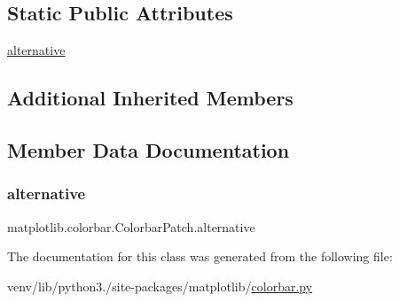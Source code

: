 \subsection*{Static Public Attributes}
\begin{DoxyCompactItemize}
\item 
\hyperlink{classmatplotlib_1_1colorbar_1_1ColorbarPatch_a7f76bba552f8eb48254b27a4f84a7993}{alternative}
\end{DoxyCompactItemize}
\subsection*{Additional Inherited Members}


\subsection{Member Data Documentation}
\mbox{\label{classmatplotlib_1_1colorbar_1_1ColorbarPatch_a7f76bba552f8eb48254b27a4f84a7993}} 
\subsubsection{\texorpdfstring{alternative}{alternative}}
{\footnotesize\ttfamily matplotlib.\+colorbar.\+Colorbar\+Patch.\+alternative\hspace{0.3cm}{\ttfamily [static]}}



The documentation for this class was generated from the following file\+:\begin{DoxyCompactItemize}
\item 
venv/lib/python3./site-\/packages/matplotlib/\hyperlink{colorbar_8py}{colorbar.\+py}\end{DoxyCompactItemize}
